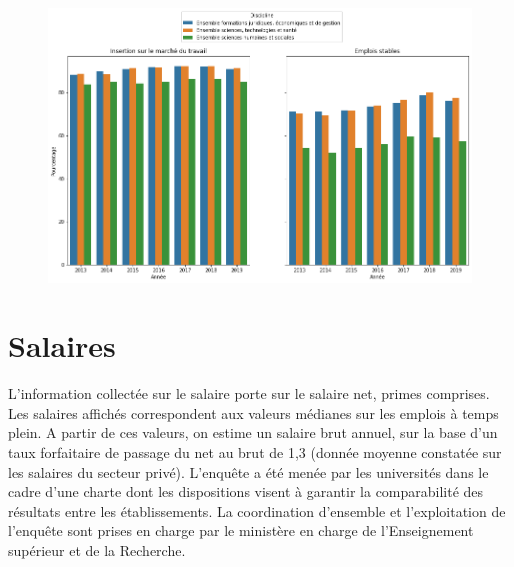\documentclass[12pt, a4paper, titlepage, table]{article}
\begin{document}
\begin{figure}[H]
	\centering
	\includegraphics[width=1\textwidth]{../graphs/insertion_emploi_stable.png}
\end{figure}

\section{Salaires}
L’information collectée sur le salaire porte sur le salaire net, primes comprises. Les salaires affichés correspondent aux valeurs médianes sur les emplois à temps plein. A partir de ces valeurs, on estime un salaire brut annuel, sur la base d’un taux forfaitaire de passage du net au brut de 1,3 (donnée moyenne constatée sur les salaires du secteur privé).
L’enquête a été menée par les universités dans le cadre d’une charte dont les dispositions visent à garantir la comparabilité des résultats entre les établissements. La coordination d’ensemble et l’exploitation de l’enquête sont prises en charge par le ministère en charge de l'Enseignement supérieur et de la Recherche.
\end{document}
